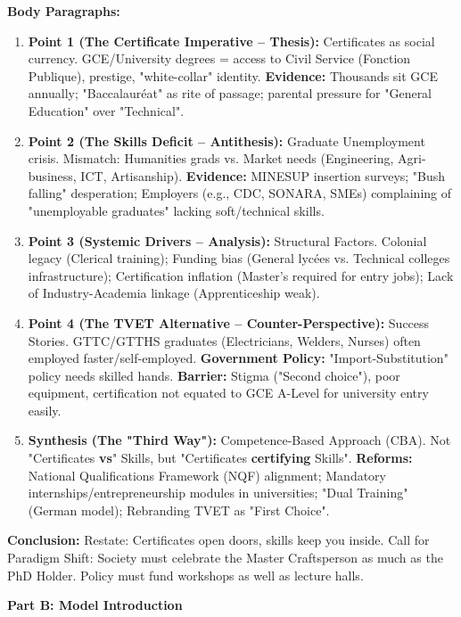 \documentclass[11pt]{article}
\newcommand{\cle}[1]{{\popxbold\color{popdark}#1}}
\begin{document}
\begin{exoresolu}
\textbf{Body Paragraphs:}
\begin{enumerate}
    \item \textbf{Point 1 (The Certificate Imperative -- Thesis):} Certificates as \cle{social currency}. GCE/University degrees = access to Civil Service (Fonction Publique), prestige, "white-collar" identity. \textbf{Evidence:} Thousands sit GCE annually; "Baccalauréat" as rite of passage; parental pressure for "General Education" over "Technical".
    \item \textbf{Point 2 (The Skills Deficit -- Antithesis):} \cle{Graduate Unemployment} crisis. Mismatch: Humanities grads vs. Market needs (Engineering, Agri-business, ICT, Artisanship). \textbf{Evidence:} MINESUP insertion surveys; "Bush falling" desperation; Employers (e.g., CDC, SONARA, SMEs) complaining of "unemployable graduates" lacking soft/technical skills.
    \item \textbf{Point 3 (Systemic Drivers -- Analysis):} \cle{Structural Factors}. Colonial legacy (Clerical training); Funding bias (General lycées vs. Technical colleges infrastructure); Certification inflation (Master's required for entry jobs); Lack of Industry-Academia linkage (Apprenticeship weak).
    \item \textbf{Point 4 (The TVET Alternative -- Counter-Perspective):} \cle{Success Stories}. GTTC/GTTHS graduates (Electricians, Welders, Nurses) often employed faster/self-employed. \textbf{Government Policy:} "Import-Substitution" policy needs skilled hands. \textbf{Barrier:} Stigma ("Second choice"), poor equipment, certification not equated to GCE A-Level for university entry easily.
    \item \textbf{Synthesis (The "Third Way"):} \cle{Competence-Based Approach (CBA)}. Not "Certificates \textbf{vs}" Skills, but "Certificates \textbf{certifying} Skills". \textbf{Reforms:} National Qualifications Framework (NQF) alignment; Mandatory internships/entrepreneurship modules in universities; "Dual Training" (German model); Rebranding TVET as "First Choice".
\end{enumerate}

\textbf{Conclusion:} Restate: Certificates open doors, skills keep you inside. Call for \cle{Paradigm Shift}: Society must celebrate the \cle{Master Craftsperson} as much as the \cle{PhD Holder}. Policy must fund workshops as well as lecture halls.

\textbf{Part B: Model Introduction}


\end{exoresolu}
\end{document}
